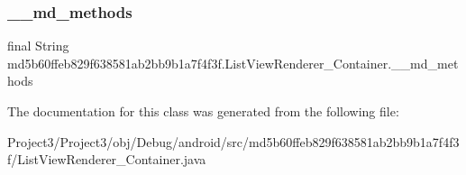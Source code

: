 \subsubsection{\texorpdfstring{\+\_\+\+\_\+md\+\_\+methods}{\_\_md\_methods}}
{\footnotesize\ttfamily final String md5b60ffeb829f638581ab2bb9b1a7f4f3f.\+List\+View\+Renderer\+\_\+\+Container.\+\_\+\+\_\+md\+\_\+methods\hspace{0.3cm}{\ttfamily [static]}}



The documentation for this class was generated from the following file\+:\begin{DoxyCompactItemize}
\item 
Project3/\+Project3/obj/\+Debug/android/src/md5b60ffeb829f638581ab2bb9b1a7f4f3f/List\+View\+Renderer\+\_\+\+Container.\+java\end{DoxyCompactItemize}
